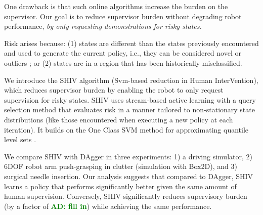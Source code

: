 \documentclass[10pt, conference]{ieeeconf}      %
\newcommand{\adnote}[1]{\ifthenelse{\boolean{include-notes}}%
 {\textcolor{green}{\textbf{AD: #1}}}{}}
\begin{document}
One drawback is that such online algorithms increase the burden on the supervisor. Our goal is to reduce supervisor burden without degrading robot performance, \emph{by only requesting demonstrations for risky states. }

Risk arises because:  (1) states are different than the states previously encountered and used to generate the current policy, i.e., they can be considered novel or outliers \cite{hodge2004survey}; or (2) states are in a region that  has been historically misclassified. 

We introduce the SHIV algorithm (Svm-based reduction in Human InterVention), which reduces supervisor burden by enabling the robot to only request supervision for risky states. SHIV uses stream-based active learning with a query selection method that evaluates risk in a manner tailored to non-stationary state distributions (like those encountered when executing a new policy at each iteration). It builds on the One Class SVM method for approximating quantile level sets \cite{scholkopf2001estimating}.




We compare SHIV with DAgger in three experiments: 1) a driving simulator, 2) 6DOF robot arm push-grasping in clutter (simulation with Box2D), and 3) surgical needle insertion. Our analysis suggests that compared to DAgger, SHIV learns a policy that performs significantly better given the same amount of human supervision. Conversely, SHIV significantly reduces supervisory burden (by a factor of \adnote{fill in}) while achieving the same performance. 








\end{document}
